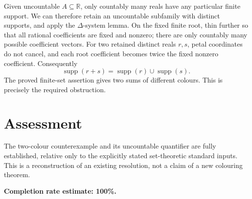 \documentclass[11pt]{article}
\begin{document}
Given uncountable $A\subseteq\mathbb R$, only countably many reals have any particular finite support. We can therefore retain an uncountable subfamily with distinct supports, and apply the $\Delta$-system lemma. On the fixed finite root, thin further so that all rational coefficients are fixed and nonzero; there are only countably many possible coefficient vectors. For two retained distinct reals $r,s$, petal coordinates do not cancel, and each root coefficient becomes twice the fixed nonzero coefficient. Consequently
\[
 \operatorname{supp}(r+s)=\operatorname{supp}(r)\cup\operatorname{supp}(s).
\]
The proved finite-set assertion gives two sums of different colours. This is precisely the required obstruction.

\section*{Assessment}
The two-colour counterexample and its uncountable quantifier are fully established, relative only to the explicitly stated set-theoretic standard inputs. This is a reconstruction of an existing resolution, not a claim of a new colouring theorem.

\textbf{Completion rate estimate: 100\%.}
\end{document}
